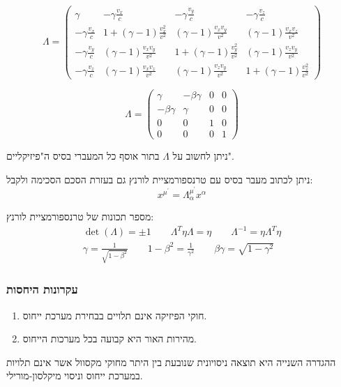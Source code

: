 \documentclass{tstextbook}
\begin{document}
\begin{definition}
$$\Lambda=  \begin{pmatrix}\gamma & -\gamma\frac{v_{x}}{c} & -\gamma\frac{v_{y}}{c} & -\gamma\frac{v_{z}}{c} \\ -\gamma\frac{v_{x}}{c} & 1+(\gamma-1)\frac{v_{x}^2}{v^2} & (\gamma-1)\frac{v_{x}v_{y}}{v^2} & (\gamma-1)\frac{v_{x}v_{z}}{v^2} \\-\gamma\frac{v_{y}}{c} & (\gamma-1)\frac{v_{x}v_{y}}{v^2} & 1+(\gamma-1)\frac{v_{y}^2}{v^2} & (\gamma-1)\frac{v_{z}v_{y}}{v^2} \\-\gamma\frac{v_{z}}{c} & (\gamma-1)\frac{v_{x}v_{z}}{v^2} & (\gamma-1)\frac{v_{z}v_{y}}{v^2} & 1+(\gamma-1)\frac{v_{z}^2}{v^2}
  \end{pmatrix}$$

\end{definition}
\begin{definition}
$$\Lambda=  \begin{pmatrix}\gamma & -\beta\gamma & 0 & 0 \\-\beta\gamma & \gamma & 0 & 0 \\0 & 0 & 1 & 0 \\0 & 0 & 0 & 1  \end{pmatrix}$$

\end{definition}
\begin{remark}
ניתן לחשוב על \(\Lambda\) בתור אוסף כל המעברי בסיס ה"פיזיקליים".

\end{remark}
ניתן לכתוב מעבר בסיס עם טרנספורמציית לורנץ גם בעזרת הסכם הסכימה ולקבל:
$$x^{\mu^{'}}=\Lambda_{\alpha}^{\mu^{'}}x^{\alpha}$$

מספר תכונות של טרנספורמציית לורנץ:
$$\begin{gather} \det\left( \Lambda \right)=\pm 1\qquad \Lambda^T\eta \Lambda=\eta \qquad  \Lambda ^{-1}=\eta \Lambda^T \eta\\ \gamma=\frac{1}{\sqrt{ 1-\beta^2 }} \qquad 1-\beta^2=\frac{1}{\gamma^2}  \qquad \beta \gamma = \sqrt{ 1-\gamma^2 } \end{gather}$$

\subsubsection{עקרונות היחסות}

\begin{definition}
  \begin{enumerate}
    \item חוקי הפיזיקה אינם תלויים בבחירת מערכת ייחוס. 


    \item מהירות האור היא קבועה בכל מערכות הייחוס. 


  \end{enumerate}
\end{definition}
ההגדרה השנייה היא תוצאה ניסויונית שנובעת בין היתר מחוקי מקסוול אשר אינם תלויות במערכת ייחוס וניסוי מיקלסון-מורילי.
\end{document}
